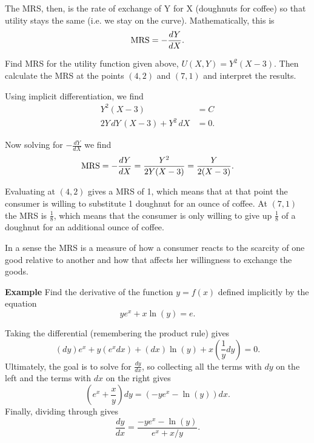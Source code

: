 \documentclass[twoside,openright,titlepage,a4paper]{book}
\begin{document}
\begin{sloppypar}
The MRS, then, is the rate of exchange of Y for X (doughnuts for coffee) so that utility stays the same (i.e. we stay on the curve). Mathematically, this is \[ \hbox{MRS} = -\frac{dY}{dX}. \]

Find MRS for the utility function given above, $U(X,Y) = Y^2(X-3)$. Then calculate the MRS at the points $(4,2)$ and $(7,1)$ and interpret the results.
	
\begin{examplebox}
Using implicit differentiation, we find
\begin{align*}
Y^2(X-3) &= C \\
2Y\, dY \,(X-3) + Y^2 \, dX &= 0.
\end{align*}

Now solving for $-\frac{dY}{dX}$ we find \[ \hbox{MRS} = -\frac{dY}{dX} = \frac{Y^2}{2Y(X-3)} = \frac{Y}{2(X-3)}. \]

Evaluating at $(4,2)$ gives a MRS of 1, which means that at that point the consumer is willing to substitute 1 doughnut for an ounce of coffee. At $(7,1)$ the MRS is $\frac{1}{8}$, which means that the consumer is only willing to give up $\frac{1}{8}$ of a doughnut for an additional ounce of coffee.

In a sense the MRS is a measure of how a consumer reacts to the scarcity of one good relative to another and how that affects her willingness to exchange the goods.	
\end{examplebox}

\textbf{Example} Find the derivative of the function $y=f(x)$ defined implicitly by the equation
\begin{equation*}
ye^x+x\ln(y) = e.
\end{equation*}
\begin{examplebox}
Taking the differential (remembering the product rule) gives
\begin{equation*}
(dy)e^x+y(e^xdx)+(dx)\ln(y) + x\left(\frac{1}{y}dy\right)= 0.
\end{equation*}
Ultimately, the goal is to solve for $\frac{dy}{dx}$, so collecting all the terms with $dy$ on the left and the terms with $dx$ on the right gives
\begin{equation*}
\left(e^x+\frac{x}{y}\right)dy = \left(-ye^x-\ln(y)\right)dx.
\end{equation*}
Finally, dividing through gives
\begin{equation*}
\frac{dy}{dx} = \frac{-ye^x-\ln(y)}{e^x+x/y}. 
\end{equation*}
\end{examplebox}
	

\end{sloppypar}
\end{document}
